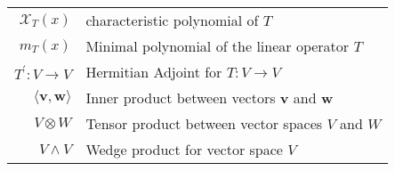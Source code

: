 \begin{tabular}{rl}
 \({\mathcal{X}}_{T}\left( x\right) \) & characteristic polynomial of \(T\)\\

 \({m}_{T}\left( x\right) \) & Minimal polynomial of the linear operator \(T\)\\

 \({T}^{\prime } : V \rightarrow  V\) & Hermitian Adjoint for \(T : V \rightarrow  V\)\\

 \(\langle \mathbf{v},\mathbf{w}\rangle \) & Inner product between vectors \(\mathbf{v}\) and \(\mathbf{w}\)\\

 \(V \otimes  W\) & Tensor product between vector spaces \(V\) and \(W\)\\

 \(V \land  V\) & Wedge product for vector space \(V\)
\end{tabular}